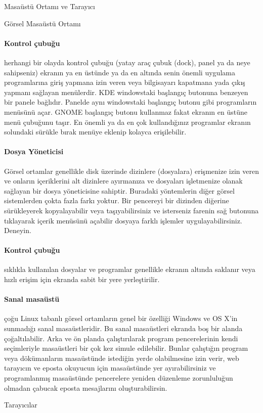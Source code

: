 \begin{section}{Masaüstü Ortamı ve Tarayıcı}
\begin{subsection}{Görsel Masaüstü Ortamı}
\paragraph{Kontrol çubuğu}{ herhangi bir olayda kontrol çubuğu (yatay araç çubuk (dock), panel ya da neye sahipseniz) ekranın ya en üstünde ya da en altında senin önemli uygulama programlarına giriş yapmana izin veren veya bilgisayarı kapatmana yada çıkış yapmanı sağlayan menülerdir. KDE windowstaki başlangıç butonuna benzeyen bir panele bağlıdır. Panelde aynı windowstaki başlangıç butonu gibi programların menüsünü açar. GNOME başlangıç butonu kullanmaz fakat ekranın en üstüne menü çubuğunu taşır. En önemli ya da en çok kullandığınız programlar ekranın solundaki sürükle bırak menüye eklenip kolayca erişilebilir.}
\paragraph{Dosya Yöneticisi}{ Görsel ortamlar genellikle disk üzerinde dizinlere (dosyalara) erişmenize izin veren ve onların içeriklerini alt dizinlere ayırmanıza ve dosyaları işletmenize olanak sağlayan bir dosya yöneticisine sahiptir. Buradaki yöntemlerin diğer görsel sistemlerden çokta fazla farkı yoktur. Bir pencereyi bir dizinden diğerine sürükleyerek kopyalayabilir veya taşıyabilirsiniz ve isterseniz farenin sağ butonuna tıklayarak içerik menüsünü açabilir dosyaya farklı işlemler uygulayabilirsiniz. Deneyin.}
\paragraph{Kontrol çubuğu}{ sıklıkla kullanılan dosyalar ve programlar genellikle ekranın altında saklanır veya hızlı erişim için ekranda sabit bir yere yerleştirilir. }
\paragraph{Sanal masaüstü}{çoğu Linux tabanlı görsel ortamların genel bir özelliği Windows ve OS X’in sunmadığı sanal masaüstleridir. Bu sanal masaüstleri ekranda boş bir alanda çoğaltılabilir. Arka ve ön planda çalıştırılarak program pencerelerinin kendi seçimleriyle masaüstleri bir çok kez simule edilebilir. Bunlar çalıştığın program veya dökümanların masaüstünde istediğin yerde olabilmesine izin verir, web tarayıcın ve eposta okuyucun için masaüstünde yer ayırabilirsiniz ve programlanmış masaüstünde pencerelere yeniden düzenleme zorunluluğun olmadan çabucak eposta mesajlarını  oluşturabilirsin.}
\end{subsection}
\begin{subsection}{Tarayıcılar}


\end{subsection}
\end{section}
